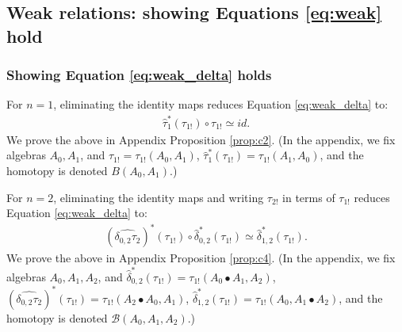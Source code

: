 \subsection{Weak relations: showing Equations \ref{eq:weak} hold} \label{sec:weak_relations}
\subsubsection{Showing Equation \ref{eq:weak_delta} holds}\label{sec:weak_relations_delta}
For $n=1$, eliminating the identity 
maps reduces Equation \ref{eq:weak_delta} to:
\begin{align*} 
\hat{\tau}_1^*(\tau_{1!}) \circ \tau_{1!} 
\simeq id.
\end{align*}
We prove the above in Appendix Proposition 
\ref{prop:c2}. (In the appendix, we fix algebras 
$A_0, A_1$, and 
$\tau_{1!} = \tau_{1!}(A_0,A_1)$, 
$\hat{\tau}_1^*(\tau_{1!}) = \tau_{1!}(A_1,A_0)$, 
and the homotopy is denoted $B(A_0,A_1)$.)

For $n=2$, eliminating the identity 
maps and writing $\tau_{2!}$ in terms 
of $\tau_{1!}$ reduces Equation \ref{eq:weak_delta} to:
\begin{align*} 
(\widehat{\delta_{0,2}\tau_2})^*(\tau_{1!}) \circ 
  \hat{\delta}_{0,2}^*(\tau_{1!})
\simeq \hat{\delta}_{1,2}^*(\tau_{1!}).
\end{align*}
We prove the above in Appendix Proposition 
\ref{prop:c4}. (In the appendix, we fix algebras 
$A_0, A_1, A_2$, and 
$\hat{\delta}_{0,2}^*(\tau_{1!}) = 
\tau_{1!}(A_0\bullet A_1, A_2)$, 
$(\widehat{\delta_{0,2}\tau_2})^*(\tau_{1!}) 
= \tau_{1!}(A_2\bullet A_0,A_1)$, 
$\hat{\delta}_{1,2}^*(\tau_{1!}) =
\tau_{1!}(A_0, A_1\bullet A_2)$, 
and the homotopy is denoted 
$\mathcal{B}(A_0,A_1,A_2)$.)

